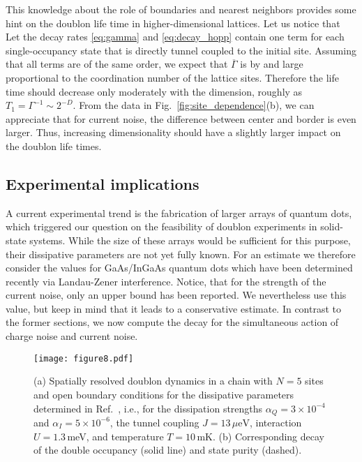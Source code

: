\documentclass[twocolumn,prb,showpacs]{revtex4-1}
\begin{document}
This knowledge about the role of boundaries and nearest neighbors provides
some hint on the doublon life time in higher-dimensional lattices.  Let us
notice that Let the decay rates \eqref{eq:gamma} and \eqref{eq:decay_hopp} 
contain one term for each single-occupancy state that is directly tunnel 
coupled to the initial site.  Assuming that all terms are of the same order, 
we expect that $\overline{\Gamma}$ is by and large proportional to the 
coordination number of the lattice sites.  Therefore the life time should 
decrease only moderately with the dimension, roughly as 
$T_1 = \Gamma^{-1} \sim 2^{-D}$.  From the data in 
Fig.~\ref{fig:site_dependence}(b), we can appreciate that for current
noise, the difference between center and border is even larger.  Thus,
increasing dimensionality should have a slightly larger impact on the
doublon life times.


\subsection{Experimental implications}
\label{sec:experiment}

A current experimental trend is the fabrication of larger arrays of quantum
dots,\cite{Puddy2015a, Zajak2016a} which triggered our question on the
feasibility of doublon experiments in solid-state systems.  While the size
of these arrays would be sufficient for this purpose, their dissipative
parameters are not yet fully known.  For an estimate we therefore consider
the values for GaAs/InGaAs quantum dots which have been determined recently
via Landau-Zener interference.\cite{Forster2014, onalpha}
Notice, that for the strength of the current noise, only an upper
bound has been reported.  We nevertheless use this value, but keep in mind
that it leads to a conservative estimate.  In contrast to the former
sections, we now compute the decay for the simultaneous action of charge
noise and current noise.

\begin{figure}
    \centering\texttt{[image: figure8.pdf]}
    \caption{(a) Spatially resolved doublon dynamics in a chain with $N=5$ 
    sites and open boundary conditions for the dissipative parameters
    determined in Ref.~, i.e., for the dissipation
    strengths\cite{onalpha} $\alpha_Q=3\times 10^{-4}$ and $\alpha_I=5\times 10^{-6}$, 
    the tunnel coupling $J=13\,\mu\mathrm{eV}$, interaction $U=1.3$\,meV, and 
    temperature $T=10$\,mK.  (b) Corresponding decay of the double occupancy 
    (solid line) and state purity (dashed).}
    \label{fig:realistic_dynamics}
\end{figure}
\end{document}
